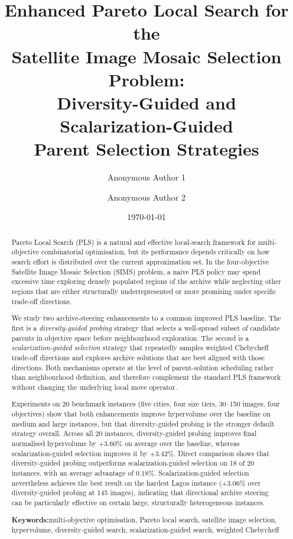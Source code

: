 \documentclass[11pt,a4paper]{article}
\title{%
  \vspace{-1.5cm}
  \textbf{Enhanced Pareto Local Search for the\\
  Satellite Image Mosaic Selection Problem:\\
  Diversity-Guided and Scalarization-Guided\\
  Parent Selection Strategies}
}
\author[1]{Anonymous Author 1}
\author[2]{Anonymous Author 2}
\affil[1]{Department of Computer Science, Anonymous University}
\affil[2]{Institute for Advanced Optimization, Anonymous Institute}
\date{\today}
\begin{document}
\maketitle

\begin{abstract}
\noindent
Pareto Local Search (PLS) is a natural and effective local-search
framework for multi-objective combinatorial optimisation, but its
performance depends critically on how search effort is distributed over
the current approximation set.  In the four-objective Satellite Image
Mosaic Selection (SIMS) problem, a naive PLS policy may spend excessive
time exploring densely populated regions of the archive while neglecting
other regions that are either structurally underrepresented or more
promising under specific trade-off directions.

We study two archive-steering enhancements to a common improved PLS
baseline.  The first is a \emph{diversity-guided probing} strategy that
selects a well-spread subset of candidate parents in objective space
before neighbourhood exploration.  The second is a
\emph{scalarization-guided selection} strategy that repeatedly samples
weighted Chebycheff trade-off directions and explores archive solutions
that are best aligned with those directions.  Both mechanisms operate at
the level of parent-solution scheduling rather than neighbourhood
definition, and therefore complement the standard PLS framework without
changing the underlying local move operator.

Experiments on 20 benchmark instances (five cities, four size tiers,
30--150 images, four objectives) show that both enhancements improve
hypervolume over the baseline on medium and large instances, but that
diversity-guided probing is the stronger default strategy overall.
Across all 20 instances, diversity-guided probing improves final
normalised hypervolume by \(+3.60\%\) on average over the baseline,
whereas scalarization-guided selection improves it by \(+3.42\%\).
Direct comparison shows that diversity-guided probing outperforms
scalarization-guided selection on 18 of 20 instances, with an average
advantage of \(0.18\%\).  Scalarization-guided selection nevertheless
achieves the best result on the hardest Lagos instance
(\(+3.06\%\) over diversity-guided probing at 145 images), indicating
that directional archive steering can be particularly effective on
certain large, structurally heterogeneous instances.

\vspace{0.5em}
\noindent\textbf{Keywords:}\quad multi-objective optimisation, Pareto local search, satellite image selection, hypervolume, diversity-guided search, scalarization-guided search, weighted Chebycheff
\end{abstract}
\end{document}
